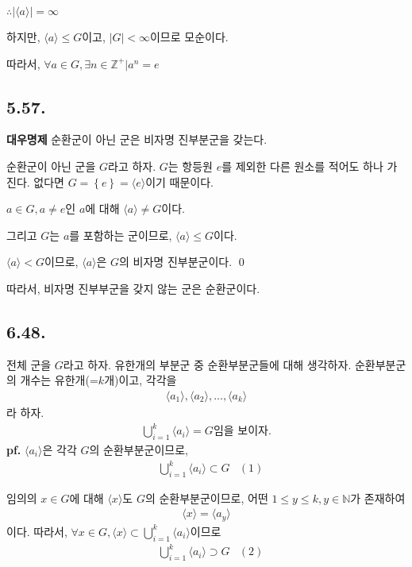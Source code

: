 \documentclass{article}
\begin{document}
$\therefore |\langle a \rangle| = \infty$

하지만,  $\langle a \rangle \leq G$이고, $|G| < \infty$이므로 모순이다. 

따라서, $\forall a \in G, \exists n \in \mathbb{Z}^{+} | a^n = e$

\subsection{5.57. }
\textbf{대우명제} 순환군이 아닌 군은 비자명 진부분군을 갖는다.

순환군이 아닌 군을 $G$라고 하자. $G$는 항등원 $e$를 제외한 다른 원소를 적어도 하나 가진다. 없다면 $G = \left\{ e \right\} = \langle e \rangle$이기 때문이다.

$a \in G, a \neq e$인 $a$에 대해 $\langle a \rangle \neq G$이다. 

그리고 $G$는 $a$를 포함하는 군이므로, $\langle a \rangle \leq G$이다.

$ \langle a \rangle < G$이므로, $\langle a \rangle$은 $G$의 비자명 진부분군이다. \qed

따라서, 비자명 진부부군을 갖지 않는 군은 순환군이다.


\subsection{6.48.}
전체 군을 $G$라고 하자. 유한개의 부분군 중 순환부분군들에 대해 생각하자. 순환부분군의 개수는 유한개(=$k$개)이고, 각각을 
\begin{align*}
\langle a_1 \rangle, \langle a_2 \rangle, ..., \langle a_k \rangle
\end{align*}라 하자.
\begin{align*}
\bigcup_{i=1}^{k} {\langle a_i \rangle} = G \text{임을 보이자.}
\end{align*}
\textbf{pf.}
$\langle a_i \rangle$은 각각 $G$의 순환부분군이므로, 
\begin{align*}
&\bigcup_{i=1}^{k} {\langle a_i \rangle} \subset G &(1)
\end{align*}

임의의 $x \in G$에 대해 $\langle x \rangle$도 $G$의 순환부분군이므로, 어떤 $1 \le y \le k, y \in \mathbb{N}$가 존재하여 
\begin{align*}
\langle x \rangle = \langle a_y \rangle
\end{align*}
이다. 따라서, $\forall x \in G, \langle x \rangle \subset \bigcup_{i=1}^{k} {\langle a_i \rangle}$이므로
\begin{align*}
&\bigcup_{i=1}^{k} {\langle a_i \rangle} \supset G &(2)
\end{align*}
\end{document}
